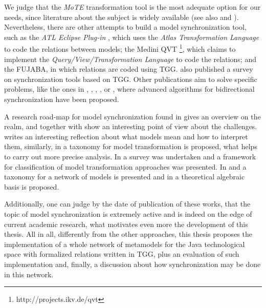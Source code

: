 \documentclass[tuberlin,cic,tc,english,noabntcite, oneside]{iiufrgs}
\begin{document}
We judge that the \emph{MoTE} transformation tool is the most adequate option for our needs, since literature about the subject is widely available (see also \citealp{giese2009efficient} and \citealp{hildebrandt2012mdelab}). Nevertheless, there are other attempts to build a model synchronization tool, such as the \emph{ATL Eclipse Plug-in} \citep{jouault2008atl}, which uses the \emph{Atlas Transformation Language} to code the relations between models; the Medini QVT \footnote{http://projects.ikv.de/qvt}, which claims to implement the \emph{Query/View/Transformation Language} to code the relations; and the FUJABA\citep{nickel2000fujaba}, in which relations are coded using TGG. \citet{hildebrandt2013survey} also published a survey on synchronization tools based on TGG. Other publications aim to solve specific problems, like the ones in \citet{hermann2011correctness}, \citet{xiong2007towards}, \citet{giese2006incremental}, \citet{ivkovic2004tracing}, or \citet{song2011instant}, where advanced algorithms for bidirectional synchronization have been proposed.

A research road-map for model synchronization found in \citet{france2007model} gives an overview on the realm, and together with \citet{mattsson2009linking} show an interesting point of view about the challenges. \citet{seidewitz2003models} writes an interesting reflection about what models mean and how to interpret them, similarly, in \citet{mens2006taxonomy} a taxonomy for model transformation is proposed, what helps to carry out more precise analysis. In \citet{czarnecki2006feature} a survey was undertaken and a framework for classification of model transformation approaches was presented. In \citeauthor{diskin2014towards} \citeyearpar{diskin2014towards} and \citeyearpar{diskin2016three} a taxonomy for a network of models is presented and in \citet{diskin2011model} a theoretical algebraic basis is proposed.

Additionally, one can judge by the date of publication of these works, that the topic of model synchronization is extremely active and is indeed on the edge of current academic research, what motivates even more the development of this thesis. All in all, differently from the other approaches, this thesis proposes the implementation of a whole network of metamodels for the Java technological space with formalized relations written in TGG, plus an evaluation of such implementation and, finally, a discussion about how synchronization may be done in this network. 

\end{document}
